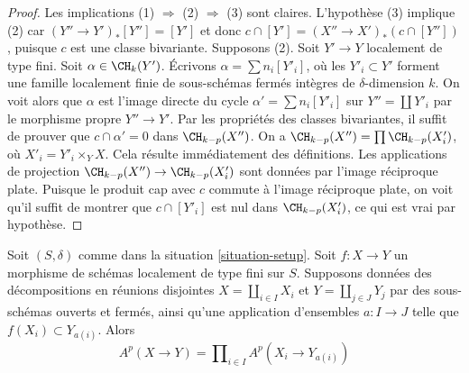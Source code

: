 \begin{proof}
Les implications (1) $\Rightarrow$ (2) $\Rightarrow$ (3) sont claires.
L'hypothèse (3) implique (2) car $(Y'' \to Y')_*[Y''] = [Y']$
et donc $c \cap [Y'] = (X'' \to X')_*(c \cap [Y''])$, puisque $c$
est une classe bivariante. Supposons (2).
Soit $Y' \to Y$ localement de type fini. Soit $\alpha \in \CH_k(Y')$.
Écrivons $\alpha = \sum n_i [Y'_i]$, où les $Y'_i \subset Y'$ forment une
famille localement finie de sous-schémas fermés intègres de $\delta$-dimension $k$.
On voit alors que $\alpha$ est l'image directe du cycle
$\alpha' = \sum n_i[Y'_i]$ sur $Y'' = \coprod Y'_i$ par le
morphisme propre $Y'' \to Y'$. Par les propriétés des classes bivariantes,
il suffit de prouver que $c \cap \alpha' = 0$ dans $\CH_{k - p}(X'')$.
On a $\CH_{k - p}(X'') = \prod \CH_{k - p}(X'_i)$, où
$X'_i = Y'_i \times_Y X$. Cela résulte immédiatement
des définitions. Les applications de projection
$\CH_{k - p}(X'') \to \CH_{k - p}(X'_i)$ sont données par l'image réciproque
plate. Puisque le produit cap avec $c$ commute à l'image réciproque
plate, on voit qu'il suffit de montrer que $c \cap [Y'_i]$
est nul dans $\CH_{k - p}(X'_i)$, ce qui est vrai par hypothèse.
\end{proof}

\begin{lemma}
\label{lemma-disjoint-decomposition-bivariant}
Soit $(S, \delta)$ comme dans la situation \ref{situation-setup}.
Soit $f : X \to Y$ un morphisme de schémas localement de type fini sur $S$.
Supposons données des décompositions en réunions disjointes
$X = \coprod_{i \in I} X_i$ et $Y = \coprod_{j \in J} Y_j$
par des sous-schémas ouverts et fermés,
ainsi qu'une application d'ensembles $a : I \to J$ telle que $f(X_i) \subset Y_{a(i)}$.
Alors
$$
A^p(X \to Y) = \prod\nolimits_{i \in I} A^p(X_i \to Y_{a(i)})
$$
\end{lemma}

